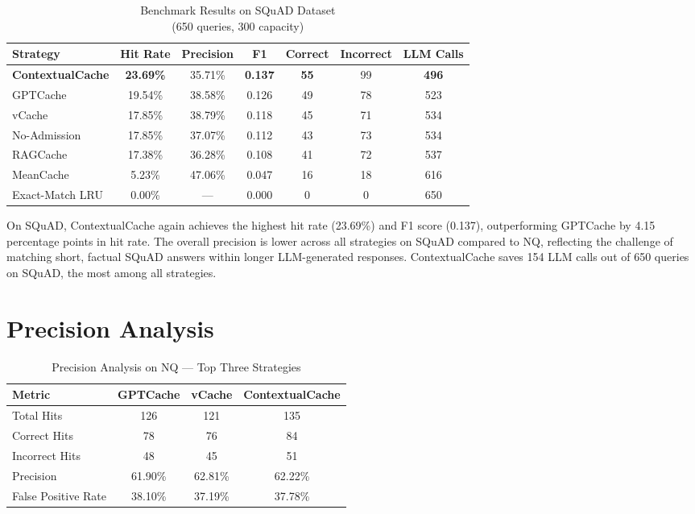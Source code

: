 \documentclass[12pt,a4paper]{report}
\begin{document}
\begin{table}[H]
\centering
\begin{tabular}{lcccccc}
\toprule
\textbf{Strategy} & \textbf{Hit Rate} & \textbf{Precision} & \textbf{F1} & \textbf{Correct} & \textbf{Incorrect} & \textbf{LLM Calls} \\
\midrule
\textbf{ContextualCache} & \textbf{23.69\%} & 35.71\% & \textbf{0.137} & \textbf{55} & 99 & \textbf{496} \\
GPTCache & 19.54\% & 38.58\% & 0.126 & 49 & 78 & 523 \\
vCache & 17.85\% & 38.79\% & 0.118 & 45 & 71 & 534 \\
No-Admission & 17.85\% & 37.07\% & 0.112 & 43 & 73 & 534 \\
RAGCache & 17.38\% & 36.28\% & 0.108 & 41 & 72 & 537 \\
MeanCache & 5.23\% & 47.06\% & 0.047 & 16 & 18 & 616 \\
Exact-Match LRU & 0.00\% & --- & 0.000 & 0 & 0 & 650 \\
\bottomrule
\end{tabular}
\caption[Benchmark Results on SQuAD Dataset]{Benchmark Results on SQuAD Dataset \\ (650 queries, 300 capacity)}
\label{tab:squad}
\end{table}

On SQuAD, ContextualCache again achieves the highest hit rate (23.69\%) and F1 score (0.137), outperforming GPTCache by 4.15 percentage points in hit rate. The overall precision is lower across all strategies on SQuAD compared to NQ, reflecting the challenge of matching short, factual SQuAD answers within longer LLM-generated responses. ContextualCache saves 154 LLM calls out of 650 queries on SQuAD, the most among all strategies.

\section{Precision Analysis}

\begin{table}[H]
\centering
\begin{tabular}{lccc}
\toprule
\textbf{Metric} & \textbf{GPTCache} & \textbf{vCache} & \textbf{ContextualCache} \\
\midrule
Total Hits & 126 & 121 & 135 \\
Correct Hits & 78 & 76 & 84 \\
Incorrect Hits & 48 & 45 & 51 \\
Precision & 61.90\% & 62.81\% & 62.22\% \\
False Positive Rate & 38.10\% & 37.19\% & 37.78\% \\
\bottomrule
\end{tabular}
\caption{Precision Analysis on NQ --- Top Three Strategies}
\label{tab:precision}
\end{table}
\end{document}
